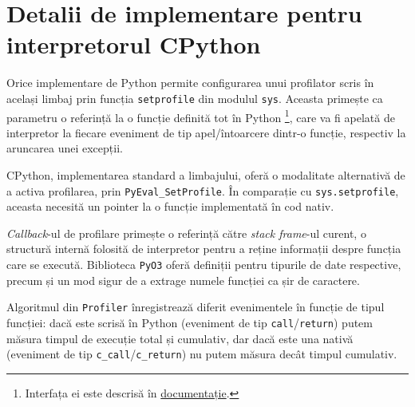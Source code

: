 \chapter{Detalii de implementare pentru interpretorul CPython}

\label{annex:python}

Orice implementare de Python permite configurarea unui profilator scris în același limbaj prin funcția \texttt{setprofile} din modulul \texttt{sys}. Aceasta primește ca parametru o referință la o funcție definită tot în Python \footnote{Interfața ei este descrisă în \href{https://docs.python.org/3/library/sys.html\#sys.setprofile}{documentație}.}, care va fi apelată de interpretor la fiecare eveniment de tip apel/întoarcere dintr-o funcție, respectiv la aruncarea unei excepții.

CPython, implementarea standard a limbajului, oferă o modalitate alternativă de a activa profilarea, prin \texttt{PyEval\_SetProfile}. În comparație cu \texttt{sys.setprofile}, aceasta necesită un pointer la o funcție implementată în cod nativ.

\textit{Callback}-ul de profilare primește o referință către \textit{stack frame}-ul curent, o structură internă folosită de interpretor pentru a reține informații despre funcția care se execută. Biblioteca \texttt{PyO3} oferă definiții pentru tipurile de date respective, precum și un mod sigur de a extrage numele funcției ca șir de caractere.

Algoritmul din \texttt{Profiler} înregistrează diferit evenimentele în funcție de tipul funcției: dacă este scrisă în Python (eveniment de tip \texttt{call}/\texttt{return}) putem măsura timpul de execuție total și cumulativ, dar dacă este una nativă (eveniment de tip \texttt{c\_call}/\texttt{c\_return}) nu putem măsura decât timpul cumulativ.